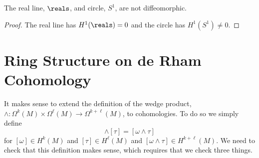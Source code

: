 \documentclass[fleqn]{NotesClass}
\begin{document}
    \begin{crl}{}{}
        The real line, \(\reals\), and circle, \(S^1\), are not diffeomorphic.
        \begin{proof}
            The real line has \(H^1(\reals) = 0\) and the circle has \(H^1(S^1) \ne 0\).
        \end{proof}
    \end{crl}
    
    \section{Ring Structure on de Rham Cohomology}
    It makes sense to extend the definition of the wedge product, \(\wedge \colon \Omega^k(M) \times \Omega^\ell(M) \to \Omega^{k + \ell}(M)\), to cohomologies.
    To do so we simply define
    \begin{equation}
        [\omega] \wedge [\tau] = [\omega \wedge \tau]
    \end{equation}
    for \([\omega] \in H^k(M)\) and \([\tau] \in H^\ell(M)\) and \([\omega \wedge \tau] \in H^{k + \ell}(M)\).
    We need to check that this definition makes sense, which requires that we check three things.
\end{document}
